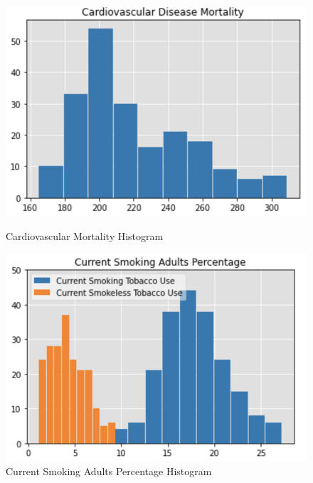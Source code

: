 \documentclass{article}
\begin{document}
\begin{figure}
\raggedright
\begin{minipage}{0.4\textwidth}
  \centering
  \includegraphics[width=1\linewidth]{hist1.png}
  \caption{Cardiovascular Mortality Histogram}
  \label{fig:figure5}
  
\end{minipage}%
\begin{minipage}{0.4\textwidth}
  \centering
  \includegraphics[width=1\linewidth]{hist2.png}
  \caption{Current Smoking Adults Percentage Histogram}
  \label{fig:figure6}
\end{minipage}
\end{figure}
\end{document}
